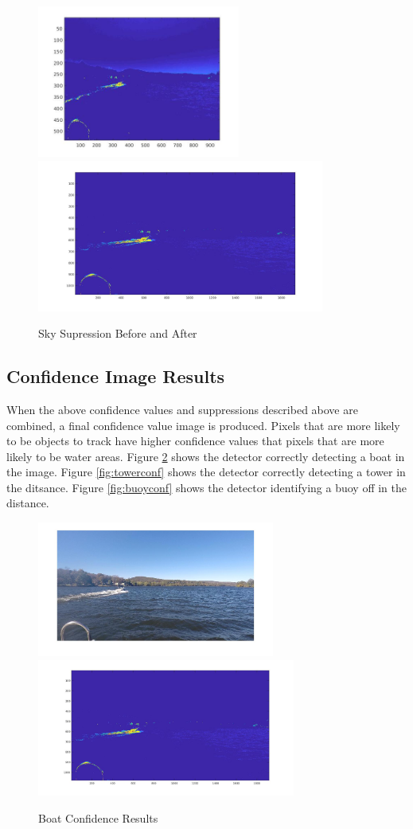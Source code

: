 \documentclass{article}
\begin{document}
\begin{figure}
\label{fig:skysuppress}
\includegraphics[height=5cm]{hsv_confidence}
\includegraphics[height=5cm]{hsv_kmeans2_suppressed}
\centering
\caption{Sky Supression Before and After}
\end{figure}

\subsection{Confidence Image Results}
When the above confidence values and suppressions described above are combined, a final confidence value image is produced. Pixels that are more likely to be objects to track have higher confidence values that pixels that are more likely to be water areas. Figure \ref{fig:boatconf} shows the detector correctly detecting a boat in the image.  Figure \ref{fig:towerconf} shows the detector correctly detecting a tower in the ditsance.  Figure \ref{fig:buoyconf} shows the detector identifying a buoy off in the distance.

\begin{figure}[H]
\label{fig:boatconf}
\includegraphics[width=7.8cm]{hsv_kmeans2_orig}
\includegraphics[width=8.5cm]{hsv_kmeans2_suppressed}
\centering
\caption{Boat Confidence Results}
\end{figure}
\end{document}
